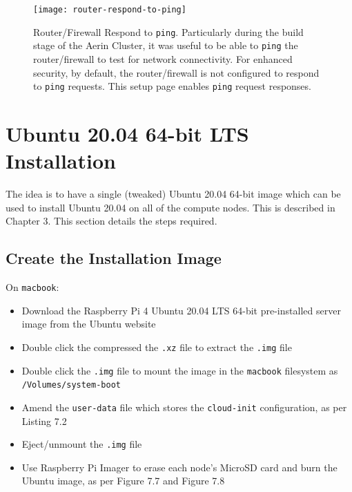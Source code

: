 \documentclass{report}
\begin{document}
\begin{figure}[H]
	\centering	
	\texttt{[image: router-respond-to-ping]}
	\caption{Router/Firewall Respond to \texttt{ping}. Particularly during the build stage of the Aerin Cluster, it was useful to be able to \texttt{ping} the router/firewall to test for network connectivity. For enhanced security, by default, the router/firewall is not configured to respond to \texttt{ping} requests. This setup page enables \texttt{ping} request responses.}
\end{figure}


%
%
\section{Ubuntu 20.04 64-bit LTS Installation}

The idea is to have a single (tweaked) Ubuntu 20.04 64-bit image which can be used to install Ubuntu 20.04 on all of the compute nodes. This is described in Chapter 3. This section details the steps required.


%
%
\subsection{Create the Installation Image}

On \verb|macbook|:

\begin{itemize}
  \item Download the Raspberry Pi 4 Ubuntu 20.04 LTS 64-bit pre-installed server image from the Ubuntu website
  \item Double click the compressed the \verb|.xz| file to extract the \verb|.img| file
  \item Double click the \verb|.img| file to mount the image in the \verb|macbook| filesystem as \verb|/Volumes/system-boot|
  \item Amend the \verb|user-data| file which stores the \verb|cloud-init| configuration, as per Listing 7.2
  \item Eject/unmount the \verb|.img| file
  \item Use Raspberry Pi Imager to erase each node's MicroSD card and burn the Ubuntu image, as per Figure 7.7 and Figure 7.8
\end{itemize}

\lstset{style=listing, float=H}

\end{document}
